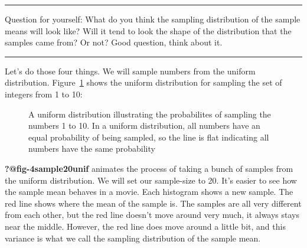 \documentclass[
  letterpaper,
  DIV=11,
  numbers=noendperiod]{scrreprt}
\begin{document}
\begin{center}\rule{0.5\linewidth}{0.5pt}\end{center}

Question for yourself: What do you think the sampling distribution of
the sample means will look like? Will it tend to look the shape of the
distribution that the samples came from? Or not? Good question, think
about it.

\begin{center}\rule{0.5\linewidth}{0.5pt}\end{center}

Let's do those four things. We will sample numbers from the uniform
distribution. Figure~\ref{fig-4Unif} shows the uniform distribution for
sampling the set of integers from 1 to 10:

\begin{figure}


\caption{\label{fig-4Unif}A uniform distribution illustrating the
probabilites of sampling the numbers 1 to 10. In a uniform distribution,
all numbers have an equal probability of being sampled, so the line is
flat indicating all numbers have the same probability}

\end{figure}%

\textbf{?@fig-4sample20unif} animates the process of taking a bunch of
samples from the uniform distribution. We will set our sample-size to
20. It's easier to see how the sample mean behaves in a movie. Each
histogram shows a new sample. The red line shows where the mean of the
sample is. The samples are all very different from each other, but the
red line doesn't move around very much, it always stays near the middle.
However, the red line does move around a little bit, and this variance
is what we call the sampling distribution of the sample mean.
\end{document}

